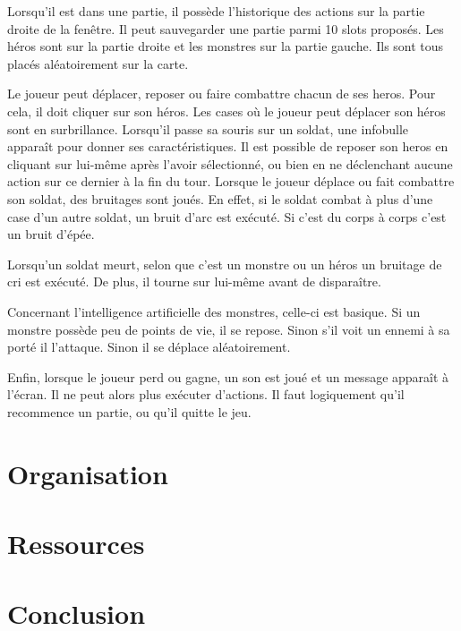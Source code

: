 \documentclass{article}
\begin{document}
Lorsqu'il est dans une partie, il possède l'historique des actions sur la partie droite de la fenêtre. 
Il peut sauvegarder une partie parmi 10 slots proposés. 
Les héros sont sur la partie droite et les monstres sur la partie gauche. Ils sont tous placés aléatoirement sur la carte. 

Le joueur peut déplacer, reposer ou faire combattre chacun de ses heros. 
Pour cela, il doit cliquer sur son héros. 
Les cases où le joueur peut déplacer son héros sont en surbrillance.
Lorsqu'il passe sa souris sur un soldat, une infobulle apparaît pour donner ses caractéristiques.
Il est possible de reposer son heros en cliquant sur lui-même après l'avoir sélectionné, ou bien en ne déclenchant aucune action sur ce dernier à la fin du tour.
Lorsque le joueur déplace ou fait combattre son soldat, des bruitages sont joués. 
En effet, si le soldat combat à plus d'une case d'un autre soldat, un bruit d'arc est exécuté. 
Si c'est du corps à corps c'est un bruit d'épée.

Lorsqu'un soldat meurt, selon que c'est un monstre ou un héros un bruitage de cri est exécuté. 
De plus, il tourne sur lui-même avant de disparaître.

Concernant l'intelligence artificielle des monstres, celle-ci est basique. 
Si un monstre possède peu de points de vie, il se repose.
Sinon s'il voit un ennemi à sa porté il l'attaque. 
Sinon il se déplace aléatoirement.

Enfin, lorsque le joueur perd ou gagne, un son est joué et un message apparaît à l'écran. Il ne peut alors plus exécuter d'actions.
Il faut logiquement qu'il recommence un partie, ou qu'il quitte le jeu.

\section{Organisation}

\section{Ressources}
\section{Conclusion}
\end{document}
